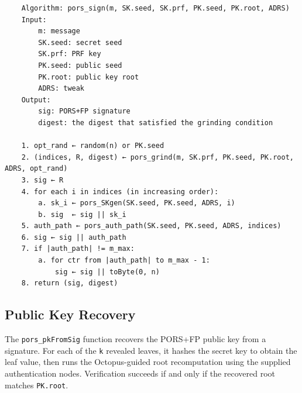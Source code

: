 \begin{verbatim}
    Algorithm: pors_sign(m, SK.seed, SK.prf, PK.seed, PK.root, ADRS)
    Input:
        m: message
        SK.seed: secret seed
        SK.prf: PRF key
        PK.seed: public seed
        PK.root: public key root
        ADRS: tweak
    Output:
        sig: PORS+FP signature
        digest: the digest that satisfied the grinding condition

    1. opt_rand ← random(n) or PK.seed
    2. (indices, R, digest) ← pors_grind(m, SK.prf, PK.seed, PK.root, ADRS, opt_rand)
    3. sig ← R
    4. for each i in indices (in increasing order):
        a. sk_i ← pors_SKgen(SK.seed, PK.seed, ADRS, i)
        b. sig  ← sig || sk_i
    5. auth_path ← pors_auth_path(SK.seed, PK.seed, ADRS, indices)
    6. sig ← sig || auth_path
    7. if |auth_path| != m_max:
        a. for ctr from |auth_path| to m_max - 1:
            sig ← sig || toByte(0, n)
    8. return (sig, digest)
\end{verbatim} 

\subsection{Public Key Recovery}
The \texttt{pors\_pkFromSig} function recovers the PORS+FP public key from a signature. 
For each of the \texttt{k} revealed leaves, it hashes the secret key to obtain the leaf value, then runs the Octopus-guided root recomputation using the supplied authentication nodes. 
Verification succeeds if and only if the recovered root matches \texttt{PK.root}.

